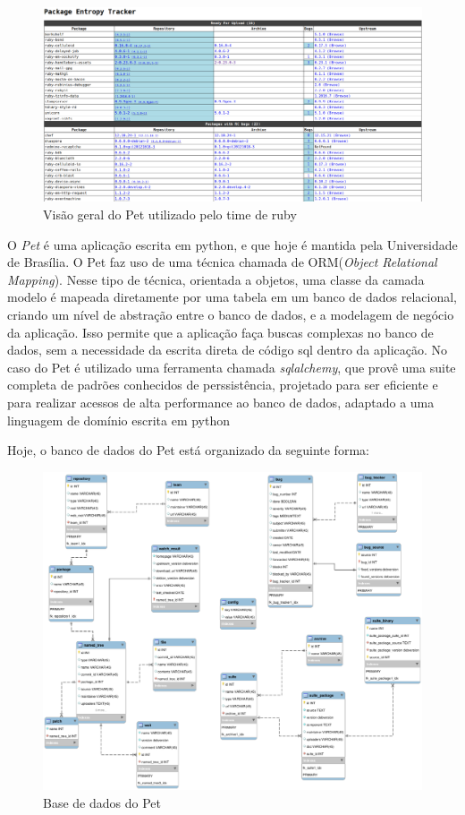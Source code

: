 \begin{figure}[h]
	\centering
	\label{fig02}
        \includegraphics[scale=0.25]{figuras/pet1.eps}
	\caption{Visão geral do Pet utilizado pelo time de ruby}
\end{figure}

O \textit{Pet} é uma aplicação escrita em python, e que hoje é mantida pela Universidade de Brasília. O Pet faz uso de uma técnica chamada de ORM(\textit{Object Relational Mapping}). 
Nesse tipo de técnica, orientada a objetos, uma classe da camada modelo é mapeada diretamente por uma tabela em um banco de dados relacional, criando um nível de abstração entre o banco de dados, e a modelagem de negócio da aplicação.
Isso permite que a aplicação faça buscas complexas no banco de dados, sem a necessidade da escrita direta de código sql dentro da aplicação. No caso do Pet é utilizado uma ferramenta chamada \textit{sqlalchemy}, que provê uma suite completa
de padrões conhecidos de perssistência, projetado para ser eficiente e para realizar acessos de alta performance ao banco de dados, adaptado a uma linguagem de domínio escrita em python\cite{sqlalchemy}

Hoje, o banco de dados do Pet está organizado da seguinte forma:
\begin{figure}[h]
	\centering
	\label{fig03}
        \includegraphics[scale=0.33]{figuras/base1.eps}
	\caption{Base de dados do Pet}
\end{figure}


